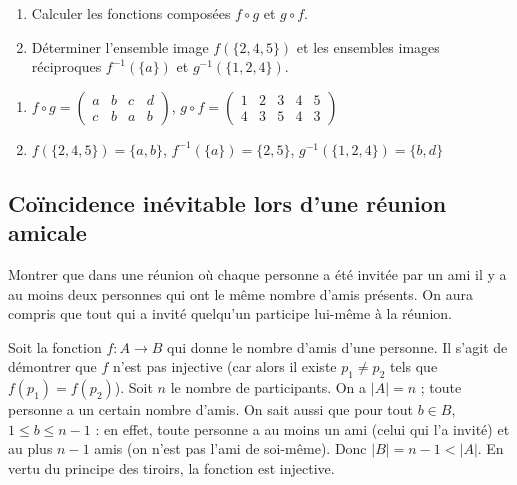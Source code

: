 \begin{enumerate}[label=(\roman*)]
    \item Calculer les fonctions composées $f \circ g$ et $g \circ f$.
    \item Déterminer l'ensemble image $f(\{2, 4, 5\})$ et les ensembles images réciproques $f^{-1}(\{a\})$ et $g^{-1}(\{1, 2, 4\})$.
\end{enumerate}

\begin{solution}
    \begin{enumerate}[label=(\roman*)]
        \item $f \circ g  = 
            \begin{pmatrix}
                a & b & c & d \\
                c & b & a & b
            \end{pmatrix}$, 
            $g \circ f =
            \begin{pmatrix}
                1 & 2 & 3 & 4 & 5 \\
                4 & 3 & 5 & 4 & 3
            \end{pmatrix}$
        \item $f(\{2,4,5\}) = \{a,b\}$, 
            $f^{-1}(\{a\}) = \{2,5\}$, 
            $g^{-1}(\{1, 2, 4\}) = \{b, d\}$
    \end{enumerate}
\end{solution}

\subsection{Coïncidence inévitable lors d'une réunion amicale}
Montrer que dans une réunion où chaque personne a été invitée par un ami il y a au moins deux personnes qui ont le même nombre d'amis présents. On aura compris que tout qui a invité quelqu'un participe lui-même à la réunion.

\begin{solution}
    Soit la fonction $f : A \rightarrow B$ qui donne le nombre d'amis d'une personne. Il s'agit de démontrer que $f$ n'est pas injective (car alors il existe $p_1 \neq p_2$ tels que $f(p_1) = f(p_2)$). Soit $n$ le nombre de participants. On a $|A| = n$ ; toute personne a un certain nombre d'amis. On sait aussi que pour tout $b \in B$, $1 \leq b \leq n-1$ : en effet, toute personne a au moins un ami (celui qui l'a invité) et au plus $n-1$ amis (on n'est pas l'ami de soi-même). Donc $|B| = n-1 < |A|$. En vertu du principe des tiroirs, la fonction est injective.
\end{solution}

